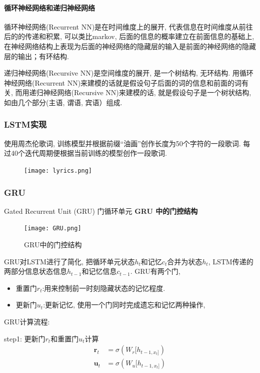 \paragraph{循环神经网络和递归神经网络}

循环神经网络(Recurrent NN)是在时间维度上的展开, 代表信息在时间维度从前往后的的传递和积累, 可以类比markov, 后面的信息的概率建立在前面信息的基础上, 在神经网络结构上表现为后面的神经网络的隐藏层的输入是前面的神经网络的隐藏层的输出；有环结构.

递归神经网络(Recursive NN)是空间维度的展开, 是一个树结构, 无环结构.
用循环神经网络(Recurrent NN)来建模的话就是假设句子后面的词的信息和前面的词有关, 而用递归神经网络(Recursive NN)来建模的话, 就是假设句子是一个树状结构, 如由几个部分(主语, 谓语, 宾语）组成.

\subsubsection{LSTM实现}
使用周杰伦歌词, 训练模型并根据前缀“油画”创作⻓度为50个字符的⼀段歌词. 每过40个迭代周期便根据当前训练的模型创作⼀段歌词. 
\begin{figure}[!ht]
    \center
    \texttt{[image: lyrics.png]}
    \end{figure} 
\subsubsection{GRU}
Gated Recurrent Unit (GRU) 门循环单元
\textbf{GRU 中的门控结构}

\begin{figure}[!htb]
\centering
\texttt{[image: GRU.png]}
\caption{GRU中的门控结构}
\end{figure}

GRU对LSTM进行了简化, 把循环单元状态$h_t$和记忆$c_t$合并为状态$h_t$, 
LSTM传递的两部分信息状态信息$h_{t−1}$和记忆信息$c_{t−1}$. 
GRU有两个门, 
\begin{itemize}
    \item 重置门$r_t$:用来控制前一时刻隐藏状态的记忆程度.
    \item 更新门$u_t$:更新记忆, 使用一个门同时完成遗忘和记忆两种操作, 
\end{itemize}

GRU计算流程:

step1: 更新门$r_t$和重置门$u_t$计算
\begin{align*}
\mathbf{r}_t  & =\sigma(W_r[h_{t-1, x_t]}) \\
\mathbf{u}_t &  =\sigma(W_u[h_{t-1, x_t]})
\end{align*} 


